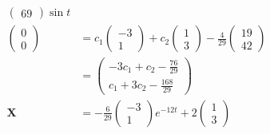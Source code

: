 \documentclass{article}
\begin{document}
\begin{align*}
\begin{pmatrix}
                                                                                                                                    69
                                                                                                                                  \end{pmatrix} \sin t         \\
  \begin{pmatrix}
    0 \\
    0
  \end{pmatrix} & = c_1 \begin{pmatrix}
                          -3 \\
                          1
                        \end{pmatrix} + c_2 \begin{pmatrix}
                                              1 \\
                                              3
                                            \end{pmatrix} - \frac{4}{29} \begin{pmatrix}
                                                                           19 \\
                                                                           42
                                                                         \end{pmatrix}                                                                        \\
                  & = \begin{pmatrix}
                        -3 c_1 + c_2 - \frac{76}{29} \\
                        c_1 + 3 c_2 - \frac{168}{29}
                      \end{pmatrix}                                                                                                             \\
  \mathbf{X}      & = -\frac{6}{29} \begin{pmatrix}
                                      -3 \\
                                      1
                                    \end{pmatrix} e^{-12 t} + 2 \begin{pmatrix}
                                                                  1 \\
                                                                  3

\end{pmatrix}
\end{align*}
\end{document}
